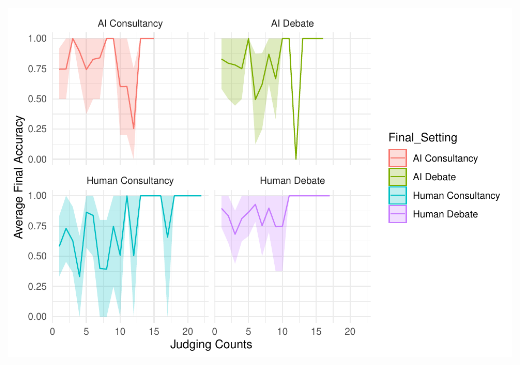 \documentclass[
]{article}
\begin{document}
\includegraphics[width=1\linewidth]{debate-2309_files/figure-latex/unnamed-chunk-3-1}
\end{document}
